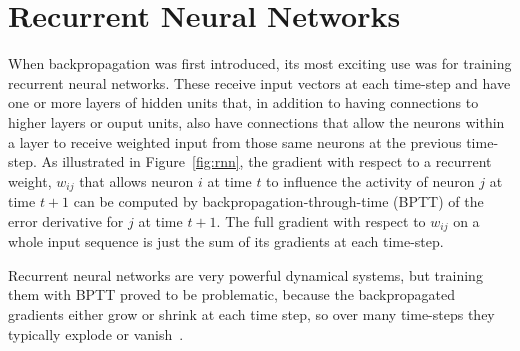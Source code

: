 \documentclass[10pts]{article}
\begin{document}

\section{Recurrent Neural Networks}

When backpropagation was first introduced, its most exciting use was for
training recurrent neural networks. These receive input vectors at each
time-step and have one or more layers of hidden units that, in addition to
having connections to higher layers or ouput units, also have connections
that allow the neurons within a layer to receive weighted input from those
same neurons at the previous time-step.  As illustrated in
Figure~\ref{fig:rnn}, the gradient with respect to a recurrent
weight, $w_{ij}$ that allows neuron $i$ at time $t$ to influence the
activity of neuron $j$ at time $t+1$ can be computed by
backpropagation-through-time (BPTT) of the error derivative for $j$ at time
$t+1$. The full gradient with respect to $w_{ij}$ on a whole input sequence is just the
sum of its gradients at each time-step.

Recurrent neural networks are very powerful dynamical systems, but training
them with BPTT proved to be problematic, because the backpropagated
gradients either grow or shrink at each time step, so over many time-steps
they typically explode or
vanish~\citep{Hochreiter91-small,Bengio-et-al-TNN1994}.
\end{document}
